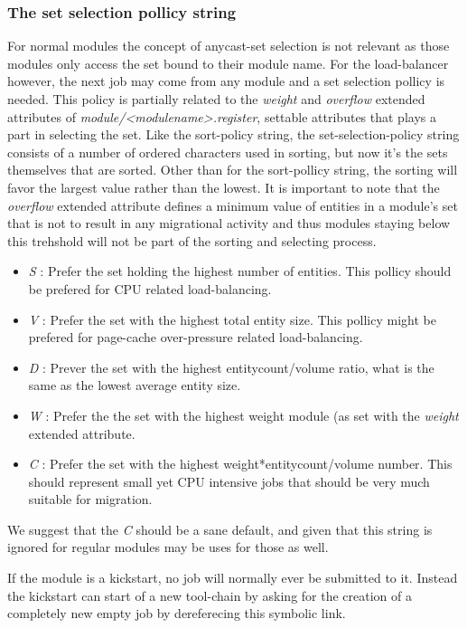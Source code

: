 \subsubsection{The set selection pollicy string}
For normal modules the concept of anycast-set selection is not relevant as those modules only access the set bound to their module name. For the load-balancer however, the next job may come from any module and a set selection pollicy is needed. This policy is partially related to the \emph{weight} and \emph{overflow} extended attributes of \emph{module/<modulename>.register}, settable attributes that plays a part in selecting the set. Like the sort-policy string, the set-selection-policy string consists of a number of ordered characters used in sorting, but now it's the sets themselves that are sorted. Other than for the sort-pollicy string, the sorting will favor the largest value rather than the lowest. It is important to note that the \emph{overflow} extended attribute defines a minimum value of entities in a module's set that is not to result in any migrational activity and thus modules staying below this trehshold will not be part of the sorting and selecting process.
\begin{itemize}
\item \emph{S} : Prefer the set holding the highest number of entities. This pollicy should be prefered for CPU related load-balancing.
\item \emph{V} : Prefer the set with the highest total entity size. This pollicy might be prefered for page-cache over-pressure related load-balancing.
\item \emph{D} : Prever the set with the highest entitycount/volume ratio, what is the same as the lowest average entity size. 
\item \emph{W} : Prefer the the set with the highest weight module (as set with the \emph{weight} extended attribute.
\item \emph{C} : Prefer the set with the highest weight*entitycount/volume number. This should represent small yet CPU intensive jobs that should be very much suitable for migration. 
\end{itemize} 
We suggest that the \emph{C} should be a sane default, and given that this string is ignored for regular modules may be uses for those as well.  

If the module is a kickstart, no job will normally ever be submitted to it. Instead the kickstart can start of a new tool-chain by asking for the creation of a completely new empty job by dereferecing this symbolic link.
